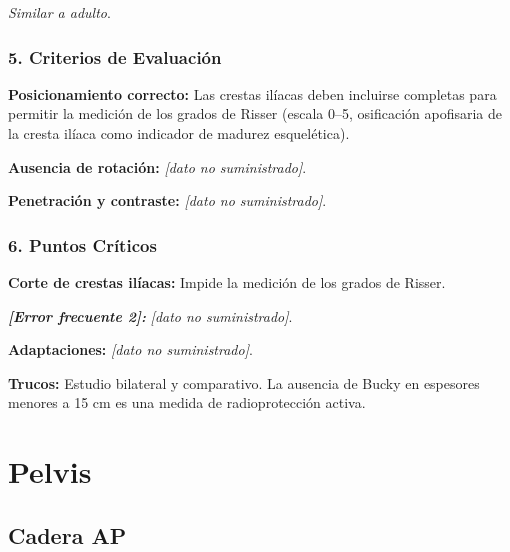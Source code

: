 	\textit{Similar a adulto}.
	
	\subsubsection*{5. Criterios de Evaluación}
	
	\textbf{Posicionamiento correcto:} Las crestas ilíacas deben incluirse completas para permitir la medición de los grados de Risser (escala 0--5, osificación apofisaria de la cresta ilíaca como indicador de madurez esquelética).
	
	\textbf{Ausencia de rotación:} \textit{[dato no suministrado]}.
	
	\textbf{Penetración y contraste:} \textit{[dato no suministrado]}.
	
	\subsubsection*{6. Puntos Críticos}
	
	\textbf{Corte de crestas ilíacas:} Impide la medición de los grados de Risser.
	
	\textbf{\textit{[Error frecuente 2]:}} \textit{[dato no suministrado]}.
	
	\textbf{Adaptaciones:} \textit{[dato no suministrado]}.
	
	\textbf{Trucos:} Estudio bilateral y comparativo. La ausencia de Bucky en espesores menores a 15 cm es una medida de radioprotección activa.
	
	\clearpage
	


	
	\section{Pelvis}
	
	\subsection{Cadera AP}
	

